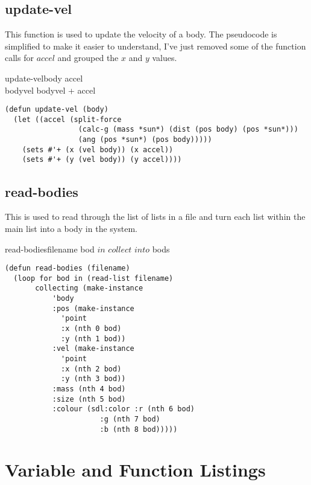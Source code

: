 \subsection{update-vel}
This function is used to update the velocity of a body. The pseudocode is
simplified to make it easier to understand, I've just removed some of the
function calls for $accel$ and grouped the $x$ and $y$ values. 

\begin{pseudocode}{update-vel}{body}
	\BEGIN
	accel \GETS {} \\
	bodyvel \GETS bodyvel + accel
	\END
\end{pseudocode}

\begin{lstlisting}
(defun update-vel (body)
  (let ((accel (split-force 
                 (calc-g (mass *sun*) (dist (pos body) (pos *sun*)))
                 (ang (pos *sun*) (pos body)))))
    (sets #'+ (x (vel body)) (x accel))
    (sets #'+ (y (vel body)) (y accel))))
\end{lstlisting}

\subsection{read-bodies}
This is used to read through the list of lists in a file and turn each list
within the main list into a body in the system. \\
\begin{pseudocode}{read-bodies}{filename}
	\FOREACH bod $ in $ 
	\DO $collect $  $ into $ bods\\
\end{pseudocode}

\begin{lstlisting}
(defun read-bodies (filename)
  (loop for bod in (read-list filename)
       collecting (make-instance 
		   'body
		   :pos (make-instance
			 'point
			 :x (nth 0 bod)
			 :y (nth 1 bod))
		   :vel (make-instance
			 'point
			 :x (nth 2 bod)	
			 :y (nth 3 bod))
		   :mass (nth 4 bod)
		   :size (nth 5 bod)
		   :colour (sdl:color :r (nth 6 bod)
				      :g (nth 7 bod)
				      :b (nth 8 bod)))))
\end{lstlisting}

\section{Variable and Function Listings}

